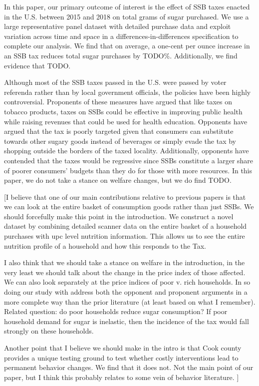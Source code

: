 \documentclass[12pt]{article}
\begin{document}
In this paper, our primary outcome of interest is the effect of SSB taxes enacted in the U.S. between 2015 and 2018 on total grams of sugar purchased. We use a large representative panel dataset with detailed purchase data and exploit variation across time and space in a differences-in-differences specification to complete our analysis. We find that on average, a one-cent per ounce increase in an SSB tax reduces total sugar purchases by TODO\%. Additionally, we find evidence that TODO.

Although most of the SSB taxes passed in the U.S. were passed by voter referenda rather than by local government officials, the policies have been highly controversial. Proponents of these measures have argued that like taxes on tobacco products, taxes on SSBs could be effective in improving public health while raising revenues that could be used for health education. Opponents have argued that the tax is poorly targeted given that consumers can substitute towards other sugary goods instead of beverages or simply evade the tax by shopping outside the borders of the taxed locality. Additionally, opponents have contended that the taxes would be regressive since SSBs constitute a larger share of poorer consumers' budgets than they do for those with more resources. In this paper, we do not take a stance on welfare changes, but we do find TODO.

[I believe that one of our main contributions relative to previous papers is that we can look at the entire basket of consumption goods rather than just SSBs. We should forcefully make this point in the introduction. We construct a novel dataset by combining detailed scanner data on the entire basket of a household purchases with upc level nutrition information. This allows us to see the entire nutrition profile of a household and how this responds to the Tax. 

I also think that we should take a stance on welfare in the introduction, in the very least we should talk about the change in the price index of those affected. We can also look separately at the price indices of poor v. rich households. In so doing our study with address both the opponent and proponent arguments in a more complete way than the prior literature (at least based on what I remember). Related question: do poor households reduce sugar consumption? If poor household demand for sugar is inelastic, then the incidence of the tax would fall strongly on these households. 

Another point that I believe we should make in the intro is that Cook county provides a unique testing ground to test whether costly interventions lead to permanent behavior changes. We find that it does not. Not the main point of our paper, but I think this probably relates to some vein of behavior literature. ]
\end{document}

